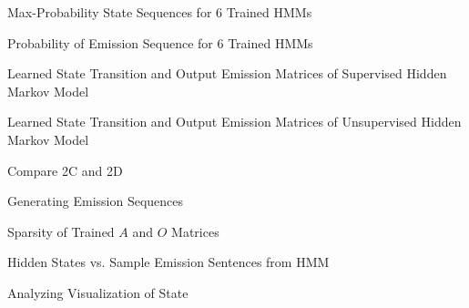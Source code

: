 \indent\problem[10] %
Max-Probability State Sequences for 6 Trained HMMs
\begin{subsolution}\normalfont{
	
}\end{subsolution}
\clearpage

\indent\problem[17] %
Probability of Emission Sequence for 6 Trained HMMs
\begin{subsolution}\normalfont{
	
}\end{subsolution}
\clearpage

\noindent\problem[10] %
Learned State Transition and Output Emission Matrices of Supervised Hidden Markov Model
\begin{subsolution}\normalfont{
	
}\end{subsolution}
\clearpage

\indent\problem[15] %
Learned State Transition and Output Emission Matrices of Unsupervised Hidden Markov Model
\begin{subsolution}\normalfont{
	
}\end{subsolution}
\clearpage

\problem[5] Compare 2C and 2D
\begin{subsolution}\normalfont{
	
}\end{subsolution}
\clearpage

\problem[5] Generating Emission Sequences
\begin{subsolution}\normalfont{
	
}\end{subsolution}
\clearpage

\indent\problem[3] %
Sparsity of Trained $A$ and $O$ Matrices
\begin{subsolution}\normalfont{
	
}\end{subsolution}
\clearpage

\indent\problem[5] %
Hidden States vs. Sample Emission Sentences from HMM

\begin{subsolution}\normalfont{
	
}\end{subsolution}
\clearpage


\indent\problem[5] %
Analyzing Visualization of State
\begin{subsolution}\normalfont{
	
}\end{subsolution}
\clearpage



